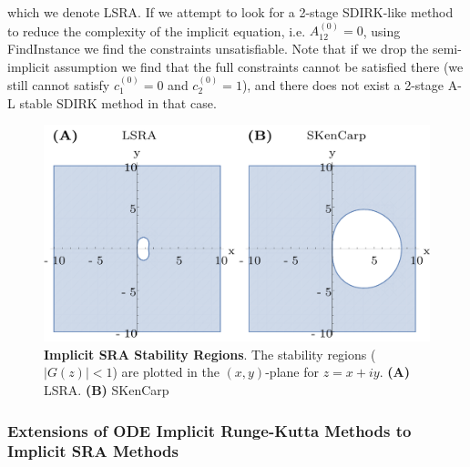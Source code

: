 \documentclass{article}
\begin{document}
which we denote LSRA. If we attempt to look for a 2-stage SDIRK-like
method to reduce the complexity of the implicit equation, i.e. $A_{12}^{(0)}=0$,
using FindInstance we find the constraints unsatisfiable. Note that
if we drop the semi-implicit assumption we find that the full constraints
cannot be satisfied there (we still cannot satisfy $c_{1}^{(0)}=0$
and $c_{2}^{(0)}=1$), and there does not exist a 2-stage A-L stable
SDIRK method in that case.
\begin{center}
	\begin{figure}
		\begin{centering}
			\includegraphics[scale=0.5]{paper_figures/ImplicitStability}
			\par\end{centering}
		\caption{\textbf{Implicit SRA Stability Regions}. The stability regions ($\left|G(z)\right|<1$)
			are plotted in the $(x,y)$-plane for $z=x+iy$. \textbf{(A)} LSRA.
			\textbf{(B)} SKenCarp\label{fig:Implicit-Stability-Regions}}
	\end{figure}
	\par\end{center}

\subsubsection{Extensions of ODE Implicit Runge-Kutta Methods to Implicit SRA Methods}
\end{document}
